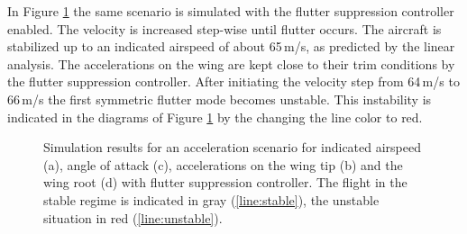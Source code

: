 \documentclass[aerospace,article,submit,moreauthors,pdftex,10pt,a4paper]{Definitions/mdpi}
\begin{document}
In Figure \ref{fig:cl} the same scenario is simulated with the flutter suppression controller enabled. The velocity is increased  step-wise until flutter occurs. The aircraft is stabilized up to an indicated airspeed of about 65\,m/s, as predicted by the linear analysis. The accelerations on the wing are kept close to their trim conditions  by the flutter suppression controller. After initiating the velocity step from 64\,m/s to 66\,m/s the first symmetric flutter mode becomes unstable. This instability is indicated in the diagrams of Figure \ref{fig:cl} by the changing the line color to red.

\begin{figure}[th]
	\centering
	
	\caption{Simulation results for an acceleration scenario for indicated airspeed (a), angle of attack (c), accelerations on the wing tip (b) and the wing root (d) with flutter suppression controller. The flight in the stable regime is indicated in gray (\ref{line:stable}), the unstable situation in red (\ref{line:unstable}).}
	\label{fig:cl}	
\end{figure}
\end{document}

